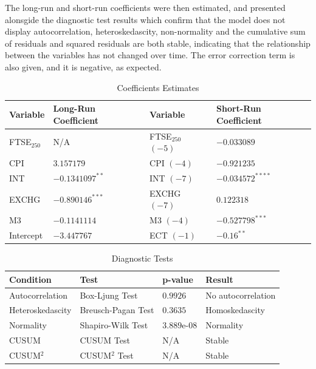 \documentclass[12pt,a4paper]{article}
\begin{document}
The long-run and short-run coefficients were then estimated, and presented 
alonsgide the diagnostic test results which confirm that the model does not
display autocorrelation, heteroskedascity, non-normality and the cumulative 
sum of residuals and squared residuals are both stable, indicating that the 
relationship between the variables has not changed over time. The error
correction term is also given, and it is negative, as expected.

\begin{table}[h!]
    \centering
    \caption{Coefficients Estimates}
    \begin{tabular}{llll}
        \toprule
        \textbf{Variable} & \textbf{Long-Run Coefficient} & \textbf{Variable} & \textbf{Short-Run Coefficient} \\
        \midrule
        FTSE$_{250}$ & N/A & FTSE$_{250}$ $(-5)$  & $-0.033089$ \\
        CPI & $3.157179$ & CPI $(-4)$ & $-0.921235$ \\
        INT & $-0.1341097^{**}$ & INT $(-7)$ & $-0.034572^{****}$\\
        EXCHG &  $-0.890146^{***}$ & EXCHG $(-7)$ & $0.122318$ \\
        M3 & $-0.1141114$ & M3 $(-4)$ & $-0.527798^{***}$ \\
        Intercept & $-3.447767$ & ECT $(-1)$ & $-0.16^{**}$ \\
        \bottomrule
    \end{tabular}
\end{table}

\begin{table}[h!]
    \centering
    \caption{Diagnostic Tests}
    \begin{tabular}{llll}
        \toprule
        \textbf{Condition} & \textbf{Test} & \textbf{p-value} & \textbf{Result} \\
        \midrule
        Autocorrelation & Box-Ljung Test & $0.9926$ & No autocorrelation \\
        Heteroskedascity & Breusch-Pagan Test & $0.3635$ & Homoskedascity \\
        Normality & Shapiro-Wilk Test & $3.889$e-$08$ & Normality \\
        CUSUM & CUSUM Test & N/A & Stable \\
        CUSUM$^2$ & CUSUM$^2$ Test & N/A & Stable \\
        \bottomrule
    \end{tabular}
\end{table}
\end{document}
